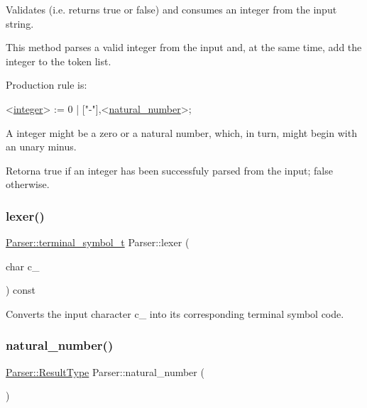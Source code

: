 Validates (i.\+e. returns true or false) and consumes an integer from the input string. 

This method parses a valid integer from the input and, at the same time, add the integer to the token list.

Production rule is\+: 
\begin{DoxyCode}
<\hyperlink{classParser_ab6b91c4e4b8bacb7d0eefca5ae9ffce6}{integer}> := 0 | [\textcolor{stringliteral}{"-"}],<\hyperlink{classParser_a18974ec32c22bb2f19f3499986de6ada}{natural\_number}>;
\end{DoxyCode}
 A integer might be a zero or a natural number, which, in turn, might begin with an unary minus.

\begin{DoxyReturn}{Retorna}
true if an integer has been successfuly parsed from the input; false otherwise. 
\end{DoxyReturn}
\mbox{\label{classParser_aa2bbaa87534abef84269d79cf7165035}} 
\subsubsection{\texorpdfstring{lexer()}{lexer()}}
{\footnotesize\ttfamily \hyperlink{classParser_a7d49b050a3c0df9e37ff81c5099be049}{Parser\+::terminal\+\_\+symbol\+\_\+t} Parser\+::lexer (\begin{DoxyParamCaption}\item[{char}]{c\+\_\+ }\end{DoxyParamCaption}) const\hspace{0.3cm}{\ttfamily [private]}}



Converts the input character c\+\_\+ into its corresponding terminal symbol code. 

\mbox{\label{classParser_a18974ec32c22bb2f19f3499986de6ada}} 
\subsubsection{\texorpdfstring{natural\+\_\+number()}{natural\_number()}}
{\footnotesize\ttfamily \hyperlink{structParser_1_1ResultType}{Parser\+::\+Result\+Type} Parser\+::natural\+\_\+number (\begin{DoxyParamCaption}{ }\end{DoxyParamCaption})\hspace{0.3cm}{\ttfamily [private]}}



